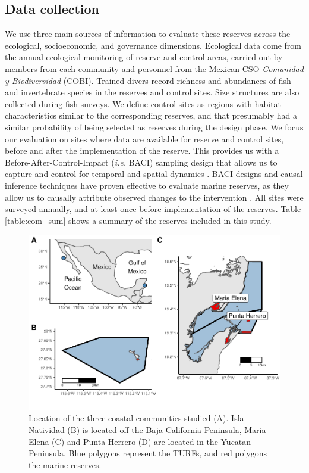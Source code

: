 \documentclass{frontiersSCNS}
\begin{document}
\subsection{Data collection}\label{data-collection}

We use three main sources of information to evaluate these reserves
across the ecological, socioeconomic, and governance dimensions.
Ecological data come from the annual ecological monitoring of reserve
and control areas, carried out by members from each community and
personnel from the Mexican CSO \emph{Comunidad y Biodiversidad}
(\href{www.cobi.org.mx}{COBI}). Trained divers record richness and
abundances of fish and invertebrate species in the reserves and control
sites. Size structures are also collected during fish surveys. We define
control sites as regions with habitat characteristics similar to the
corresponding reserves, and that presumably had a similar probability of
being selected as reserves during the design phase. We focus our
evaluation on sites where data are available for reserve and control
sites, before and after the implementation of the reserve. This provides
us with a Before-After-Control-Impact (\emph{i.e.} BACI) sampling design
that allows us to capture and control for temporal and spatial dynamics
\citep{depalma_2018,ferraro_2006-oW}. BACI designs and causal inference
techniques have proven effective to evaluate marine reserves, as they
allow us to causally attribute observed changes to the intervention
\citep{moland_2013-VP,Villasenor-Derbez_2018}. All sites were surveyed
annually, and at least once before implementation of the reserves. Table
\ref{table:com_sum} shows a summary of the reserves included in this
study.

\begin{figure}
\centering
\includegraphics{Villasenor-Derbez_files/figure-latex/unnamed-chunk-1-1.pdf}
\caption{\label{fig:unnamed-chunk-1}\label{fig:map}Location of the three
coastal communities studied (A). Isla Natividad (B) is located off the
Baja California Peninsula, Maria Elena (C) and Punta Herrero (D) are
located in the Yucatan Peninsula. Blue polygons represent the TURFs, and
red polygons the marine reserves.}
\end{figure}
\end{document}
